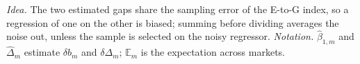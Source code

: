 \noindent\emph{Idea.} The two estimated gaps share the sampling error of the E-to-G index, so a regression of one on the other is biased; summing before dividing averages the noise out, unless the sample is selected on the noisy regressor. \emph{Notation.} $\hat\beta_{1,m}$ and $\hat\Delta_m$ estimate $\delta b_m$ and $\delta\Delta_m$; $\mathbb E_m$ is the expectation across markets.
